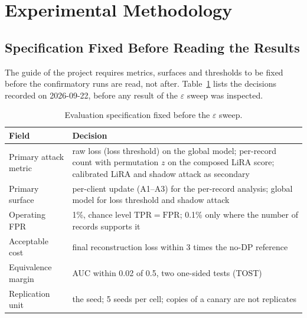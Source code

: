 
\section{Experimental Methodology}
\label{sec:method}

\subsection{Specification Fixed Before Reading the Results}
\label{sec:method-spec}

The guide of the project requires metrics, surfaces and thresholds to be
fixed before the confirmatory runs are read, not after. Table~\ref{tab:spec}
lists the decisions recorded on 2026-09-22, before any result of the
$\varepsilon$ sweep was inspected.

\begin{table}[t]
\centering
\caption{Evaluation specification fixed before the $\varepsilon$ sweep.}
\label{tab:spec}
\footnotesize
\begin{tabular}{@{}p{2.0cm}p{5.9cm}@{}}
\toprule
Field & Decision \\
\midrule
Primary attack metric & raw loss (loss threshold) on the global model; per-record count with permutation $z$ on the composed LiRA score; calibrated LiRA and shadow attack as secondary \\
Primary surface & per-client update (A1--A3) for the per-record analysis; global model for loss threshold and shadow attack \\
Operating FPR & 1\%, chance level $\mathrm{TPR} = \mathrm{FPR}$; 0.1\% only where the number of records supports it \\
Acceptable cost & final reconstruction loss within 3 times the no-DP reference \\
Equivalence margin & AUC within 0.02 of 0.5, two one-sided tests (TOST) \\
Replication unit & the seed; 5 seeds per cell; copies of a canary are not replicates \\
\bottomrule
\end{tabular}
\end{table}

